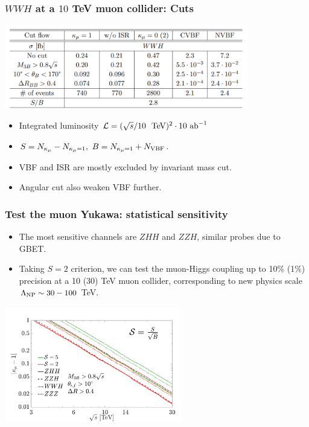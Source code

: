 \documentclass[aspectratio=169]{beamer}
\begin{document}
\begin{frame}
	\frametitle{$WWH$ at a $10$ TeV muon collider: Cuts}
	\centering
	\includegraphics[width=0.8\textwidth]{figs/WWH_cut.png}
	\begin{itemize}
		\item Integrated luminosity $\mathcal{L}=(\sqrt{s}/10~ ~\textrm{TeV} )^2\cdot10~\textrm{ab}^{-1}$ 
		\item $S=N_{\kappa_\mu}-N_{\kappa_\mu=1}, ~ B=N_{\kappa_\mu=1}+N_{\rm VBF}$.
		\item VBF and ISR are mostly excluded by invariant mass cut.
		\item Angular cut also weaken VBF further.
	\end{itemize}
\end{frame}

\begin{frame}
	\frametitle{Test the muon Yukawa: statistical sensitivity}
	\vspace{3mm}
	\begin{itemize}
		\item The most sensitive channels are $ZHH$ and $ZZH$, similar probes due to GBET.
		\item Taking $S=2$ criterion, we can test the muon-Higgs coupling up to 10\% (1\%) precision at a 10 (30) TeV muon collider, corresponding to new physics scale $\Lambda_{\rm NP}\sim30-100$ TeV.
		\end{itemize}
	\centering
	\includegraphics[width=0.58\textwidth]{figs/sig_contour}
\end{frame}
\end{document}
